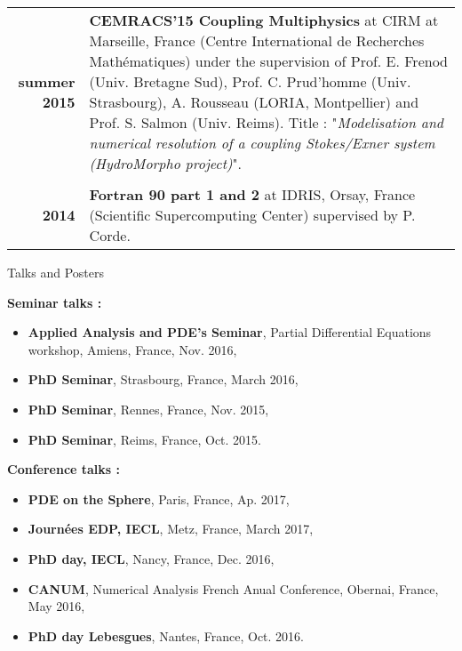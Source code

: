 \documentclass[10pt,a4paper]{report}
\begin{document}
\begin{center}
\begin{tabular}{r p{12cm}}
\textbf{summer 2015} & \textbf{CEMRACS'15 Coupling Multiphysics} at CIRM at Marseille, France (Centre International de Recherches Mathématiques) under the supervision of Prof. E. Frenod (Univ. Bretagne Sud), Prof. C. Prud'homme (Univ. Strasbourg), A. Rousseau (LORIA, Montpellier) and Prof. S. Salmon (Univ. Reims).\newline
Title : "\textit{Modelisation and numerical resolution of a coupling Stokes/Exner system (HydroMorpho project)}".\\

& \\

\textbf{2014} & \textbf{Fortran 90 part 1 and 2} at IDRIS, Orsay, France (Scientific Supercomputing Center) supervised by P. Corde.\\

\end{tabular}
\end{center}


\vspace{.5cm}
\newpage
\noindent
{\selectfont
\begin{Large}
Talks and Posters
\end{Large}
\hrulefill
}
\vspace{0.5cm}
\noindent

\noindent
{\selectfont
\textbf{Seminar talks :}
}

\begin{itemize}
\item \textbf{Applied Analysis and PDE's Seminar}, Partial Differential Equations workshop, Amiens, France, Nov. 2016,
\item \textbf{PhD Seminar}, Strasbourg, France, March 2016,
\item \textbf{PhD Seminar}, Rennes, France, Nov. 2015,
\item \textbf{PhD Seminar}, Reims, France, Oct. 2015.
\end{itemize}

\vspace{0.3cm}
\noindent
{\selectfont
\textbf{Conference talks :}
}

\begin{itemize}
\item \textbf{PDE on the Sphere}, Paris, France, Ap. 2017,
\item \textbf{Journées EDP, IECL}, Metz, France, March 2017,
\item \textbf{PhD day, IECL}, Nancy, France, Dec. 2016,
\item \textbf{CANUM}, Numerical Analysis French Anual Conference, Obernai, France, May 2016,
\item \textbf{PhD day Lebesgues}, Nantes, France, Oct. 2016.
\end{itemize}
\end{document}
